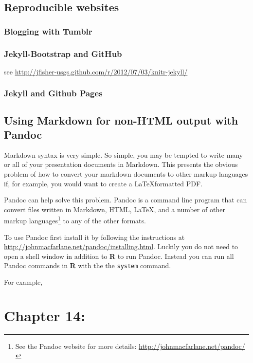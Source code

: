 \documentclass[ChapterTOCs,krantz1]{krantz}\usepackage{graphicx, color}
\begin{document}
\section{Reproducible websites}

\subsection{Blogging with Tumblr}

\subsection{Jekyll-Bootstrap and GitHub}

see \url{http://jfisher-usgs.github.com/r/2012/07/03/knitr-jekyll/}

\subsection{Jekyll and Github Pages}

\section{Using Markdown for non-HTML output with Pandoc}

Markdown syntax is very simple. So simple, you may be tempted to write many or all of your presentation documents in Markdown. This presents the obvious problem of how to convert your markdown documents to other markup languages if, for example, you would want to create a \LaTeX formatted PDF. 

Pandoc can help solve this problem. Pandoc is a command line program that can convert files written in Markdown, HTML, \LaTeX, and a number of other markup languages\footnote{See the Pandoc website for more details: {\url{http://johnmacfarlane.net/pandoc/}}} to any of the other formats. 

To use Pandoc first install it by following the instructions at {\url{http://johnmacfarlane.net/pandoc/installing.html}}. Luckily you do not need to open a shell window in addition to {\bf{R}} to run Pandoc. Instead you can run all Pandoc commands in {\bf{R}} with the the {\tt{system}} command. 

For example, 


  




\chapter{Chapter 14:}






\clearpage
\printindex
\end{document}
